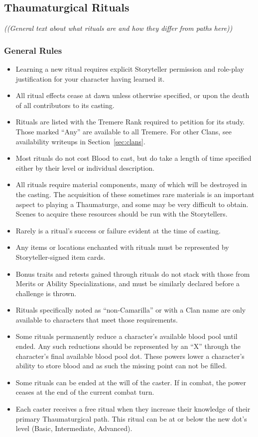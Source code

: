 \subsection{Thaumaturgical Rituals}
\label{sec:trituals}

\emph{((General text about what rituals are and how they differ from paths here))}

\subsubsection{General Rules}
\begin{itemize}
	\item Learning a new ritual requires explicit Storyteller permission and role-play 
	justification for your character having learned it.
	\item All ritual effects cease at dawn unless otherwise specified, or upon the death of 
	all contributors to its casting.
	\item Rituals are listed with the Tremere Rank required to petition for its study.  Those 
	marked ``Any'' are available to all Tremere.  For other Clans, see availability writeups 
	in Section~\ref{sec:clans}.
	\item Most rituals do not cost Blood to cast, but do take a length of time specified either 
	by their level or individual description.
	\item All rituals require material components, many of which will be destroyed in the 
	casting.  The acquisition of these sometimes rare materials is an important aspect to 
	playing a Thaumaturge, and some may be very difficult to obtain.  Scenes to acquire 
	these resources should be run with the Storytellers.
	\item Rarely is a ritual's success or failure evident at the time of casting.
	\item Any items or locations enchanted with rituals must be represented by Storyteller-signed 
	item cards.
	\item Bonus traits and retests gained through rituals do not stack with those from Merits or 
	Ability Specializations, and must be similarly declared before a challenge is thrown.
	\item Rituals specifically noted as ``non-Camarilla'' or with a Clan name are only available 
	to characters that meet those requirements.
	\item Some rituals permanently reduce a character's available blood pool until ended.  Any 
	such reductions should be represented by an ``X'' through the character's final available blood 
	pool dot.  These powers lower a character's ability to store blood and as such the missing point 
	can not be filled.
	\item Some rituals can be ended at the will of the caster.  If in combat, the power ceases at the 
	end of the current combat turn.
	\item Each caster receives a free ritual when they increase their knowledge of their primary 
	Thaumaturgical path. This ritual can be at or below the new dot's level (Basic, Intermediate, Advanced).
\end{itemize}

